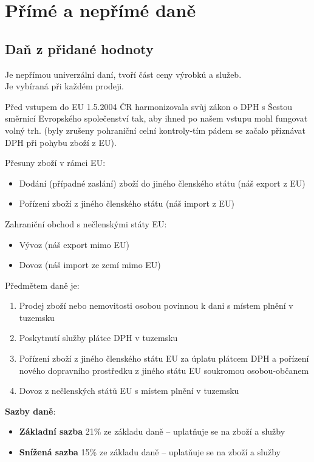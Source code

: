 \chapter{Přímé a nepřímé daně}

\section*{Daň z přidané hodnoty}

Je nepřímou univerzální daní, tvoří část ceny výrobků a služeb. \\
Je vybíraná při každém prodeji.

Před vstupem do EU 1.5.2004 ČR harmonizovala svůj zákon o DPH s Šestou směrnicí Evropského společenství tak, aby ihned po našem vstupu mohl fungovat volný trh. (byly zrušeny pohraniční celní kontroly-tím pádem se začalo přiznávat DPH při pohybu zboží z EU).

Přesuny zboží v rámci EU:
\begin{itemize}
    \item Dodání (případné zaslání) zboží do jiného členského státu (náš export z EU)
    \item Pořízení zboží z jiného členského státu (náš import z EU)
\end{itemize}

Zahraniční obchod s nečlenskými státy EU:
\begin{itemize}
    \item Vývoz (náš export mimo EU)
    \item Dovoz (náš import ze zemí mimo EU)
\end{itemize}

Předmětem daně je:
\begin{enumerate}
    \item Prodej zboží nebo nemovitosti osobou povinnou k dani s místem plnění v tuzemsku
    \item Poskytnutí služby plátce DPH v tuzemsku
    \item Pořízení zboží z jiného členského státu EU za úplatu plátcem DPH a pořízení nového dopravního prostředku z jiného státu EU soukromou osobou-občanem
    \item Dovoz z nečlenských států EU s místem plnění v tuzemsku
\end{enumerate}

\textbf{Sazby daně}:
\begin{itemize}
    \item \textbf{Základní sazba} 21\% ze základu daně -- uplatňuje se na zboží a služby
    \item \textbf{Snížená sazba} 15\% ze základu daně -- uplatňuje se na zboží a služby
\end{itemize}

